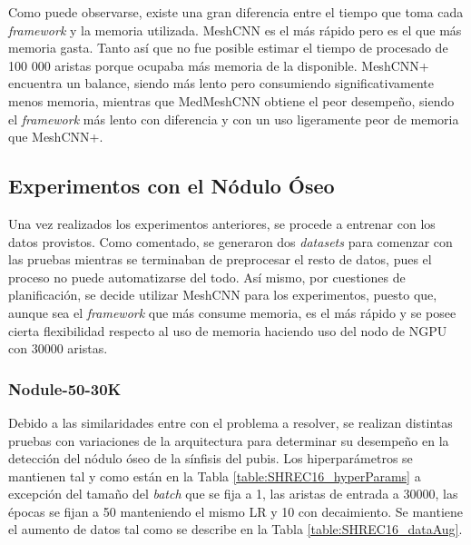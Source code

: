 Como puede observarse, existe una gran diferencia entre el tiempo que toma cada \textit{framework} y la memoria utilizada. MeshCNN es el más rápido pero es el que más memoria gasta. Tanto así que no fue posible estimar el tiempo de procesado de 100 000 aristas porque ocupaba más memoria de la disponible. MeshCNN+ encuentra un balance, siendo más lento pero consumiendo significativamente menos memoria, mientras que MedMeshCNN obtiene el peor desempeño, siendo el \textit{framework} más lento con diferencia y con un uso ligeramente peor de memoria que MeshCNN+.

\subsection{Experimentos con el Nódulo Óseo}
Una vez realizados los experimentos anteriores, se procede a entrenar con los datos provistos. Como comentado, se generaron dos \textit{datasets} para comenzar con las pruebas mientras se terminaban de preprocesar el resto de datos, pues el proceso no puede automatizarse del todo. Así mismo, por cuestiones de planificación, se decide utilizar MeshCNN para los experimentos, puesto que, aunque sea el \textit{framework} que más consume memoria, es el más rápido y se posee cierta flexibilidad respecto al uso de memoria haciendo uso del nodo de NGPU con 30000 aristas.

\subsubsection{Nodule-50-30K}
Debido a las similaridades entre  con el problema a resolver, se realizan distintas pruebas con variaciones de la arquitectura para determinar su desempeño en la detección del nódulo óseo de la sínfisis del pubis. Los hiperparámetros se mantienen tal y como están en la Tabla \ref{table:SHREC16_hyperParams} a excepción del tamaño del \textit{batch} que se fija a 1, las aristas de entrada a 30000, las épocas se fijan a 50 manteniendo el mismo LR y 10 con decaimiento. Se mantiene el aumento de datos tal como se describe en la Tabla \ref{table:SHREC16_dataAug}.

